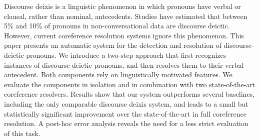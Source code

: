 Discourse deixis is a linguistic phenomenon in which pronouns have verbal or clausal, rather than nominal, antecedents. Studies have estimated that between 5\% and 10\% of pronouns in non-conversational data are discourse deictic. However, current coreference resolution systems ignore this phenomenon. This paper presents an automatic system for the detection and resolution of discourse-deictic pronouns. We introduce a two-step approach that first recognizes instances of discourse-deictic pronouns, and then resolves them to their verbal antecedent. Both components rely on linguistically motivated features. We evaluate the components in isolation and in combination with two state-of-the-art coreference resolvers. Results show that our system outperforms several baselines, including the only comparable discourse deixis system, and leads to a small but statistically significant improvement over the state-of-the-art in full coreference resolution. A post-hoc error analysis reveals the need for a less strict evaluation of this task.
